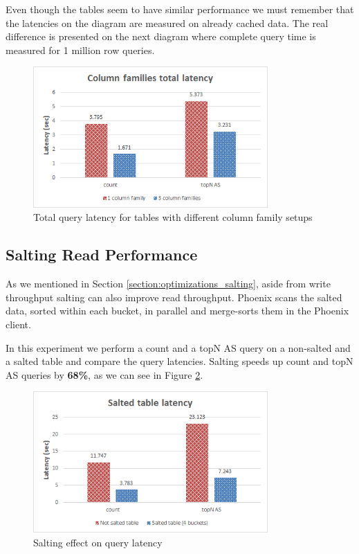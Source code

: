 Even though the tables seem to have similar performance we must remember that the latencies on the diagram are measured on already cached data. The real difference is presented on the next diagram where complete query time is measured for 1 million row queries.

\begin{figure}[H]
\centering
\includegraphics[width=0.8\textwidth]{figures/benchmarks_hbase_cf_total_latency}
\caption{Total query latency for tables with different column family setups}
\label{figure:benchmarks_hbase_cf_total_latency}
\end{figure}

\subsection{Salting Read Performance}\label{subsection:benchmarks_hbase_salting}

As we mentioned in Section \ref{section:optimizations_salting}, aside from write throughput salting can also improve read throughput. Phoenix scans the  salted data, sorted within each bucket, in parallel and merge-sorts them in the Phoenix client.

In this experiment we perform a count and a topN AS query on a non-salted and a salted table and compare the query latencies. Salting speeds up count and topN AS queries by \textbf{68\%}, as we can see in Figure \ref{figure:benchmarks_hbase_salting_latency}.

\begin{figure}[H]
\centering
\includegraphics[width=0.8\textwidth]{figures/benchmarks_hbase_salting_latency}
\caption{Salting effect on query latency}
\label{figure:benchmarks_hbase_salting_latency}
\end{figure}


